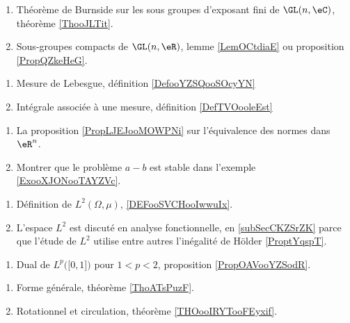 \begin{enumerate}
    \item 
        Théorème de Burnside sur les sous groupes d'exposant fini de \( \GL(n,\eC)\), théorème \ref{ThooJLTit}.
    \item 
        Sous-groupes compacts de \( \GL(n,\eR)\), lemme \ref{LemOCtdiaE} ou proposition \ref{PropQZkeHeG}.
\end{enumerate}

    \begin{enumerate}
        \item
            Mesure de Lebesgue, définition \ref{DefooYZSQooSOcyYN}
        \item
            Intégrale associée à une mesure, définition \ref{DefTVOooleEst}
        \end{enumerate}

    \begin{enumerate}
\item
    La proposition \ref{PropLJEJooMOWPNi} sur l'équivalence des normes dans \( \eR^n\).
\item
    Montrer que le problème \( a-b\) est stable dans l'exemple \ref{ExooXJONooTAYZVc}.
\end{enumerate}

    \begin{enumerate}
        \item
            Définition de \( L^2(\Omega,\mu)\), \ref{DEFooSVCHooIwwuIx}.
        \item
            L'espace \( L^2\)  est discuté en analyse fonctionnelle, en \ref{subSecCKZSrZK} parce que l'étude de \( L^2\) utilise entre autres l'inégalité de Hölder \ref{ProptYqspT}.
\end{enumerate}

\begin{enumerate}
    \item
        Dual de \( L^p\big( \mathopen[ 0 , 1 \mathclose] \big)\) pour \( 1<p<2\), proposition \ref{PropOAVooYZSodR}.
\end{enumerate}

    \begin{enumerate}
        \item
            Forme générale, théorème \ref{ThoATsPuzF}.
        \item
            Rotationnel et circulation, théorème \ref{THOooIRYTooFEyxif}.
        \end{enumerate}

